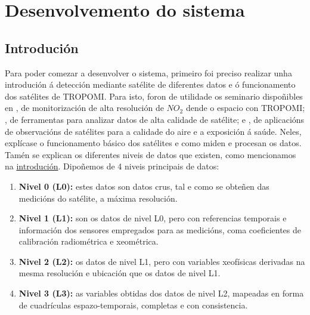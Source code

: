\section{Desenvolvemento do sistema}\label{desenvolvemento}
\subsection{Introdución}
Para poder comezar a desenvolver o sistema, primeiro foi preciso realizar unha introdución á detección mediante satélite de diferentes datos e ó funcionamento dos satélites de TROPOMI. Para isto,
foron de utilidade os seminario dispoñibles en \cite{ARSETformation}, de monitorización de alta resolución de $NO_2$ dende o espacio con TROPOMI; \cite{ARSETtools}, de ferramentas para analizar
datos de alta calidade de satélite; e \cite{ARSETaplications}, de aplicacións de observacións de satélites para a calidade do aire e a exposición á saúde. Neles, explícase o funcionamento básico dos
satélites e como miden e procesan os datos. Tamén se explican os diferentes niveis de datos que existen, como mencionamos na \hyperref[introducion]{introdución}. Dipoñemos de 4 niveis principais de
datos:
\begin{enumerate}
    \item \textbf{Nivel 0 (L0):} estes datos son datos crus, tal e como se obteñen das medicións do satélite, a máxima resolución.
    \item \textbf{Nivel 1 (L1):} son os datos de nivel L0, pero con referencias temporais e información dos sensores empregados para as medicións, coma coeficientes de calibración radiométrica e
    xeométrica.
    \item \textbf{Nivel 2 (L2):} os datos de nivel L1, pero con variables xeofísicas derivadas na mesma resolución e ubicación que os datos de nivel L1.
    \item \textbf{Nivel 3 (L3):} as variables obtidas dos datos de nivel L2, mapeadas en forma de cuadrículas espazo-temporais, completas e con consistencia.
\end{enumerate}

